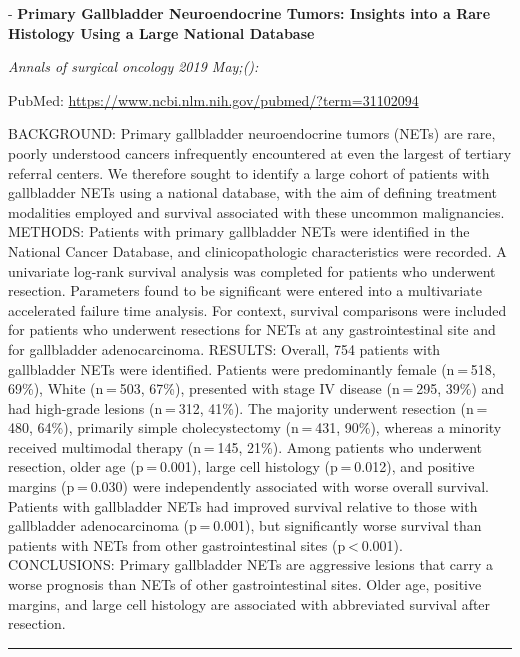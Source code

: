 \documentclass[]{article}
\begin{document}
 - \textbf{Primary Gallbladder Neuroendocrine Tumors: Insights into a
Rare Histology Using a Large National Database}

\emph{Annals of surgical oncology 2019 May;():}

PubMed: \url{https://www.ncbi.nlm.nih.gov/pubmed/?term=31102094}

BACKGROUND: Primary gallbladder neuroendocrine tumors (NETs) are rare,
poorly understood cancers infrequently encountered at even the largest
of tertiary referral centers. We therefore sought to identify a large
cohort of patients with gallbladder NETs using a national database, with
the aim of defining treatment modalities employed and survival
associated with these uncommon malignancies. METHODS: Patients with
primary gallbladder NETs were identified in the National Cancer
Database, and clinicopathologic characteristics were recorded. A
univariate log-rank survival analysis was completed for patients who
underwent resection. Parameters found to be significant were entered
into a multivariate accelerated failure time analysis. For context,
survival comparisons were included for patients who underwent resections
for NETs at any gastrointestinal site and for gallbladder
adenocarcinoma. RESULTS: Overall, 754 patients with gallbladder NETs
were identified. Patients were predominantly female (n = 518, 69\%),
White (n = 503, 67\%), presented with stage IV disease (n = 295, 39\%)
and had high-grade lesions (n = 312, 41\%). The majority underwent
resection (n = 480, 64\%), primarily simple cholecystectomy (n = 431,
90\%), whereas a minority received multimodal therapy (n = 145, 21\%).
Among patients who underwent resection, older age (p = 0.001), large
cell histology (p = 0.012), and positive margins (p = 0.030) were
independently associated with worse overall survival. Patients with
gallbladder NETs had improved survival relative to those with
gallbladder adenocarcinoma (p = 0.001), but significantly worse survival
than patients with NETs from other gastrointestinal sites
(p \textless{} 0.001). CONCLUSIONS: Primary gallbladder NETs are
aggressive lesions that carry a worse prognosis than NETs of other
gastrointestinal sites. Older age, positive margins, and large cell
histology are associated with abbreviated survival after resection.

{}

{}

\begin{center}\rule{0.5\linewidth}{\linethickness}\end{center}
\end{document}
